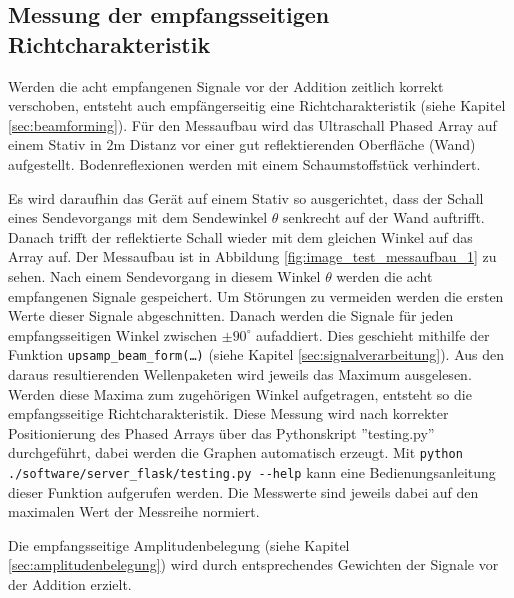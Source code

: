 \clearpage
\subsection{Messung der empfangsseitigen Richtcharakteristik}\label{sec:messung_der_empfangsseitigen_richtcharakteristik}

Werden die acht empfangenen Signale vor der Addition zeitlich korrekt verschoben, entsteht auch empfängerseitig eine Richtcharakteristik (siehe Kapitel \ref{sec:beamforming}). Für den Messaufbau wird das Ultraschall Phased Array auf einem Stativ in $2 \mathrm{m}$ Distanz vor einer gut reflektierenden Oberfläche (Wand) aufgestellt.  Bodenreflexionen werden mit einem Schaumstoffstück verhindert.

Es wird daraufhin das Gerät auf einem Stativ so ausgerichtet, dass der Schall eines Sendevorgangs mit dem Sendewinkel $\theta$ senkrecht auf der Wand auftrifft. Danach trifft der reflektierte Schall wieder mit dem gleichen Winkel auf das Array auf. Der Messaufbau ist in Abbildung \ref{fig:image_test_messaufbau_1} zu sehen.
Nach einem Sendevorgang in diesem Winkel $\theta$ werden die acht empfangenen Signale gespeichert. Um Störungen zu vermeiden werden die ersten Werte dieser Signale abgeschnitten. Danach werden die Signale für jeden empfangsseitigen Winkel zwischen $\pm 90^{\circ}$ aufaddiert. Dies geschieht mithilfe der Funktion \texttt{upsamp\_beam\_form(\dots)} (siehe Kapitel \ref{sec:signalverarbeitung}).
Aus den daraus resultierenden Wellenpaketen wird jeweils das Maximum ausgelesen.
Werden diese Maxima zum zugehörigen Winkel aufgetragen, entsteht so die empfangsseitige Richtcharakteristik. Diese Messung wird nach korrekter Positionierung des Phased Arrays über das Pythonskript ''testing.py'' durchgeführt, dabei werden die Graphen automatisch erzeugt. Mit \texttt{python ./software/server\_flask/testing.py -{}-help} kann eine Bedienungsanleitung dieser Funktion aufgerufen werden. Die Messwerte sind jeweils dabei auf den maximalen Wert der Messreihe normiert.

Die empfangsseitige Amplitudenbelegung (siehe Kapitel \ref{sec:amplitudenbelegung}) wird durch entsprechendes Gewichten der Signale vor der Addition erzielt.

